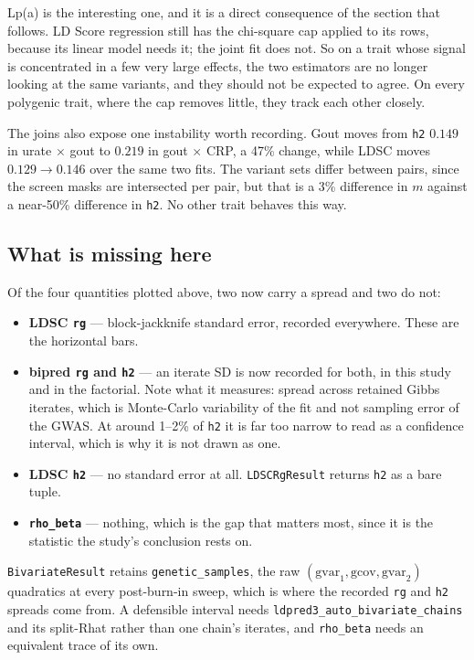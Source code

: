 Lp(a) is the interesting one, and it is a direct consequence of the section
that follows. LD Score regression still has the chi-square cap applied to its
rows, because its linear model needs it; the joint fit does not. So on a trait
whose signal is concentrated in a few very large effects, the two estimators
are no longer looking at the same variants, and they should not be expected to
agree. On every polygenic trait, where the cap removes little, they track each
other closely.

The joins also expose one instability worth recording. Gout moves from
\texttt{h2} $0.149$ in urate $\times$ gout to $0.219$ in gout $\times$ CRP, a
47\% change, while LDSC moves $0.129 \rightarrow 0.146$ over the same two fits.
The variant sets differ between pairs, since the screen masks are intersected
per pair, but that is a 3\% difference in $m$ against a near-50\% difference in
\texttt{h2}. No other trait behaves this way.

\subsection*{What is missing here}

Of the four quantities plotted above, two now carry a spread and two do not:

\begin{itemize}\setlength{\itemsep}{0.3em}
\item \textbf{LDSC \texttt{rg}} --- block-jackknife standard error, recorded
  everywhere. These are the horizontal bars.
\item \textbf{bipred \texttt{rg} and \texttt{h2}} --- an iterate SD is now
  recorded for both, in this study and in the factorial. Note what it measures:
  spread across retained Gibbs iterates, which is Monte-Carlo variability of
  the fit and not sampling error of the GWAS. At around 1--2\% of \texttt{h2}
  it is far too narrow to read as a confidence interval, which is why it is not
  drawn as one.
\item \textbf{LDSC \texttt{h2}} --- no standard error at all.
  \texttt{LDSCRgResult} returns \texttt{h2} as a bare tuple.
\item \textbf{\texttt{rho\_beta}} --- nothing, which is the gap that matters
  most, since it is the statistic the study's conclusion rests on.
\end{itemize}

\texttt{BivariateResult} retains \texttt{genetic\_samples}, the raw
$(\mathrm{gvar}_1, \mathrm{gcov}, \mathrm{gvar}_2)$ quadratics at every
post-burn-in sweep, which is where the recorded \texttt{rg} and \texttt{h2}
spreads come from. A defensible interval needs
\texttt{ldpred3\_auto\_bivariate\_chains} and its split-Rhat rather than one
chain's iterates, and \texttt{rho\_beta} needs an equivalent trace of its own.
